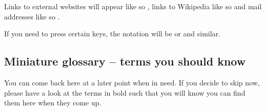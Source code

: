 \documentclass{olli-handout}
\begin{document}
Links to external websites will appear like so , links to Wikipedia like so  and mail addresses like so .

If you need to press certain keys, the notation will be \keys{\enter} or  and similar.

\subsection{Miniature glossary -- terms you should know}

You can come back here at a later point when in need. If you decide to skip now, please have a look at the terms in bold such that you will know you can find them here when they come up.
\end{document}
